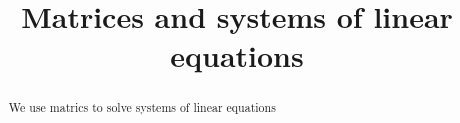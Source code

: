 \documentclass{ximera}
\title{Matrices and systems of linear equations}
\begin{document}
\begin{abstract}
  We use matrics to solve systems of linear equations
\end{abstract}
\maketitle
\end{document}
